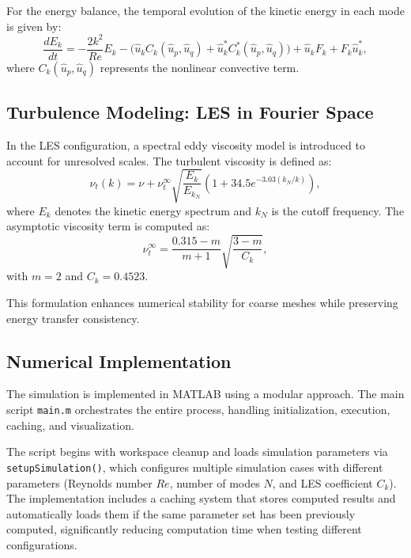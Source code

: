 For the energy balance, the temporal evolution of the kinetic energy in each mode is given by:
\begin{equation}
\frac{dE_k}{dt} = -\frac{2k^2}{Re}E_k - \big(\hat{u}_kC_k(\hat{u}_p,\hat{u}_q) + \hat{u}_k^{*}C_k^{*}(\hat{u}_p,\hat{u}_q)\big) + \hat{u}_kF_k + F_k\hat{u}_k^{*},
\end{equation}
where $C_k(\hat{u}_p,\hat{u}_q)$ represents the nonlinear convective term.

\subsection{Turbulence Modeling: LES in Fourier Space}
In the LES configuration, a spectral eddy viscosity model is introduced to account for unresolved scales. The turbulent viscosity is defined as:
\begin{equation}
\nu_t(k) = \nu + \nu_t^{\infty} 
\sqrt{\frac{E_k}{E_{k_N}}}
\left(1 + 34.5e^{-3.03(k_N/k)}\right),
\end{equation}
where $E_k$ denotes the kinetic energy spectrum and $k_N$ is the cutoff frequency. The asymptotic viscosity term is computed as:
\begin{equation}
\nu_t^{\infty} = \frac{0.315 - m}{m+1}\sqrt{\frac{3 - m}{C_k}},
\end{equation}
with $m = 2$ and $C_k = 0.4523$.

This formulation enhances numerical stability for coarse meshes while preserving energy transfer consistency.

\subsection{Numerical Implementation}
The simulation is implemented in MATLAB using a modular approach. The main script \texttt{main.m} orchestrates the entire process, handling initialization, execution, caching, and visualization.

The script begins with workspace cleanup and loads simulation parameters via \texttt{setupSimulation()}, which configures multiple simulation cases with different parameters (Reynolds number $Re$, number of modes $N$, and LES coefficient $C_k$). The implementation includes a caching system that stores computed results and automatically loads them if the same parameter set has been previously computed, significantly reducing computation time when testing different configurations.

